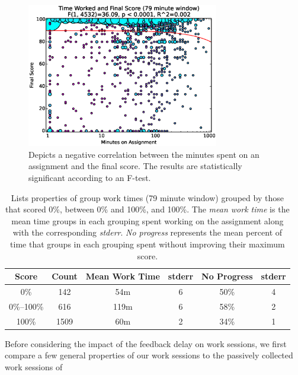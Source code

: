 \begin{figure}[!t]
\centering \includegraphics[width=3.3in]{graphs/Time_Worked_and_Final_Score_(79_minute_window).eps}
\caption{Depicts a negative correlation between the minutes spent on an
  assignment and the final score. The results are statistically significant
  according to an F-test.}
\end{figure}

\begin{table}
\centering
\begin{tabular}{|c||c|c|c|c|c|} \hline
Score & Count & Mean Work Time & stderr & No Progress & stderr \\ \hline \hline
0\% & 142 & 54m & 6 & 50\% & 4 \\ \hline
0\%--100\% & 616 & 119m & 6 & 58\% & 2 \\ \hline
100\% & 1509 & 60m & 2 & 34\% & 1 \\ \hline
\end{tabular}
\caption{Lists properties of group work times (79 minute window) grouped by
  those that scored 0\%, between 0\% and 100\%, and 100\%. The \emph{mean work
    time} is the mean time groups in each grouping spent working on the
  assignment along with the corresponding \emph{stderr}. \emph{No progress}
  represents the mean percent of time that groups in each grouping spent
  without improving their maximum score.}
\end{table}

Before considering the impact of the feedback delay on work sessions, we first
compare a few general properties of our work sessions to the passively
collected work sessions of \spacco[.]{}

